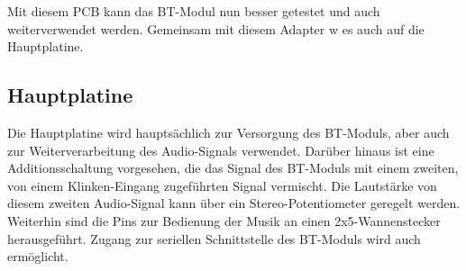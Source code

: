 Mit diesem PCB kann das BT-Modul nun besser getestet und auch weiterverwendet werden.
	Gemeinsam mit diesem Adapter w es auch auf die Hauptplatine.
\newpage


\subsection*{Hauptplatine} \label{subsec:5.3.8}
Die Hauptplatine wird hauptsächlich zur Versorgung des BT-Moduls, aber auch zur Weiterverarbeitung des Audio-Signals verwendet.
Darüber hinaus ist eine Additionsschaltung vorgesehen, die das Signal des BT-Moduls mit einem zweiten, von einem Klinken-Eingang zugeführten Signal vermischt.
Die Lautstärke von diesem zweiten Audio-Signal kann über ein Stereo-Potentiometer geregelt werden.
\\
Weiterhin sind die Pins zur Bedienung der Musik an einen 2x5-Wannenstecker herausgeführt.
Zugang zur seriellen Schnittstelle des BT-Moduls wird auch ermöglicht.
\\

